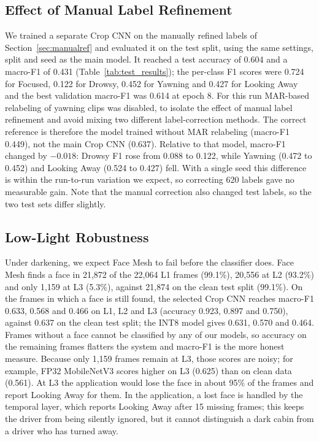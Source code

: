 \documentclass[conference]{IEEEtran}
\begin{document}
\subsection{Effect of Manual Label Refinement}\label{sec:manualeffect}
We trained a separate Crop CNN on the manually refined labels of Section~\ref{sec:manualref} and evaluated it on the test split, using the same settings, split and seed as the main model. It reached a test accuracy of 0.604 and a macro-F1 of 0.431 (Table~\ref{tab:test_results}); the per-class F1 scores were 0.724 for Focused, 0.122 for Drowsy, 0.452 for Yawning and 0.427 for Looking Away and the best validation macro-F1 was 0.614 at epoch 8. For this run MAR-based relabeling of yawning clips was disabled, to isolate the effect of manual label refinement and avoid mixing two different label-correction methods. The correct reference is therefore the model trained without MAR relabeling (macro-F1 0.449), not the main Crop CNN (0.637). Relative to that model, macro-F1 changed by $-0.018$: Drowsy F1 rose from 0.088 to 0.122, while Yawning (0.472 to 0.452) and Looking Away (0.524 to 0.427) fell. With a single seed this difference is within the run-to-run variation we expect, so correcting 620 labels gave no measurable gain. Note that the manual correction also changed test labels, so the two test sets differ slightly.

\subsection{Low-Light Robustness}\label{sec:lowlightres}
Under darkening, we expect Face Mesh to fail before the classifier does. Face Mesh finds a face in 21,872 of the 22,064 L1 frames (99.1\%), 20,556 at L2 (93.2\%) and only 1,159 at L3 (5.3\%), against 21,874 on the clean test split (99.1\%). On the frames in which a face is still found, the selected Crop CNN reaches macro-F1 0.633, 0.568 and 0.466 on L1, L2 and L3 (accuracy 0.923, 0.897 and 0.750), against 0.637 on the clean test split; the INT8 model gives 0.631, 0.570 and 0.464. Frames without a face cannot be classified by any of our models, so accuracy on the remaining frames flatters the system and macro-F1 is the more honest measure. Because only 1,159 frames remain at L3, those scores are noisy; for example, FP32 MobileNetV3 scores higher on L3 (0.625) than on clean data (0.561). At L3 the application would lose the face in about 95\% of the frames and report Looking Away for them. In the application, a lost face is handled by the temporal layer, which reports Looking Away after 15 missing frames; this keeps the driver from being silently ignored, but it cannot distinguish a dark cabin from a driver who has turned away.
\end{document}
